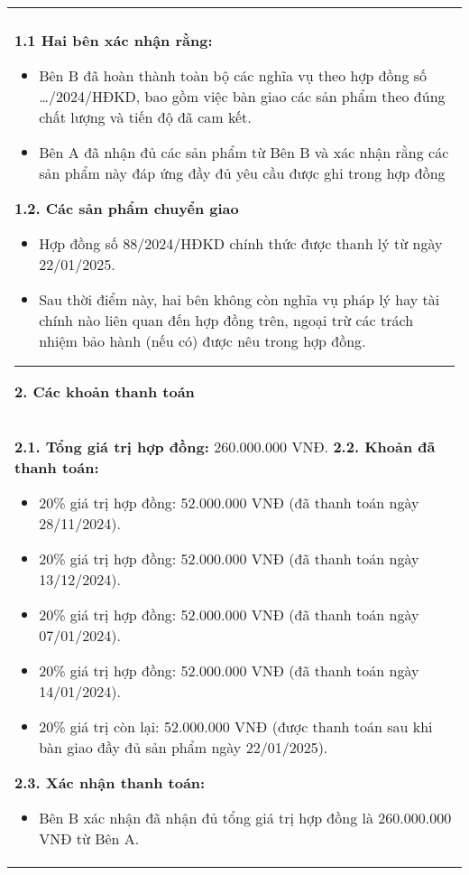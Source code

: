 \begin{longtable}{|p{\textwidth}|}
    \hline
    \begin{minipage}{\textwidth}
        \noindent\rule{\textwidth}{0.4pt}

        \noindent\textbf{1. Nội dung thanh lý hợp đồng} \\
        \noindent\textbf{1.1 Hai bên xác nhận rằng:}
        \begin{itemize}
            \item Bên B đã hoàn thành toàn bộ các nghĩa vụ theo hợp đồng số …/2024/HĐKD, bao gồm việc bàn giao các sản phẩm theo đúng chất lượng và tiến độ đã cam kết.
            \item Bên A đã nhận đủ các sản phẩm từ Bên B và xác nhận rằng các sản phẩm này đáp ứng đầy đủ yêu cầu được ghi trong hợp đồng
        \end{itemize}
        \noindent\textbf{1.2. Các sản phẩm chuyển giao}
        \begin{itemize}
            \item Hợp đồng số 88/2024/HĐKD chính thức được thanh lý từ ngày 22/01/2025.
            \item Sau thời điểm này, hai bên không còn nghĩa vụ pháp lý hay tài chính nào liên quan đến hợp đồng trên, ngoại trừ các trách nhiệm bảo hành (nếu có) được nêu trong hợp đồng.
        \end{itemize}
        \noindent\rule{\textwidth}{0.4pt}

        \vspace{0.2cm}

        \noindent\textbf{2. Các khoản thanh toán} \\
        \noindent\textbf{2.1. Tổng giá trị hợp đồng:} 260.000.000 VNĐ.
        \noindent\textbf{2.2. Khoản đã thanh toán:}
        \begin{itemize}
            \item 20\% giá trị hợp đồng: 52.000.000 VNĐ (đã thanh toán ngày 28/11/2024).
            \item 20\% giá trị hợp đồng: 52.000.000 VNĐ (đã thanh toán ngày 13/12/2024).
            \item 20\% giá trị hợp đồng: 52.000.000 VNĐ (đã thanh toán ngày 07/01/2024).
            \item 20\% giá trị hợp đồng: 52.000.000 VNĐ (đã thanh toán ngày 14/01/2024).
            \item 20\% giá trị còn lại: 52.000.000 VNĐ (được thanh toán sau khi bàn giao đầy đủ sản phẩm ngày 22/01/2025).
        \end{itemize}
        \noindent\textbf{2.3. Xác nhận thanh toán:}
        \begin{itemize}
            \item Bên B xác nhận đã nhận đủ tổng giá trị hợp đồng là 260.000.000 VNĐ từ Bên A.
        \end{itemize}


\end{minipage}
\end{longtable}
